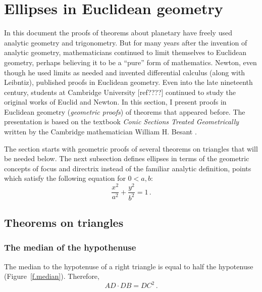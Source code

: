 
\section{Ellipses in Euclidean geometry}\label{s.geometry}

In this document the proofs of theorems about planetary have freely used analytic geometry and trigonometry. But for many years after the invention of analytic geometry, mathematicians continued to limit themselves to Euclidean geometry, perhaps believing it to be a ``pure'' form of mathematics. Newton, even though he used limits as needed and invented differential calculus (along with Leibntiz), published proofs in Euclidean geometry. Even into the late nineteenth century, students at Cambridge University [ref????] continued to study the original works of Euclid and Newton. In this section, I present proofs in Euclidean geometry (\emph{geometric proofs}) of theorems that appeared before. The presentation is based on the textbook \emph{Conic Sections Treated Geometrically} written by the Cambridge mathematician William H. Besant \cite{besant}.

The section starts with geometric proofs of several theorems on triangles that will be needed below. The next subsection defines ellipses in terms of the geometric concepts of focus and directrix instead of the familiar analytic definition, points which satisfy the following equation for $0<a,b$:
\[
\frac{x^2}{a^2}+\frac{y^2}{b^2}=1\,.
\]




\subsection{Theorems on triangles}


\subsubsection*{The median of the hypothenuse}

\begin{theorem}
The median to the hypotenuse of a right triangle is equal to half the hypotenuse (Figure~\ref{f.median}). Therefore,
\[
AD \cdot DB = DC^2\,.
\]
\end{theorem}

